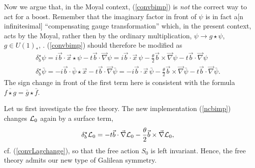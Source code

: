 \documentclass[a4paper,11pt]{article}
\def\vb{{\vec b}}
\def\vx{{\vec x}}
\def\vnabla{{\vec\nabla}}
\begin{document}
Now we argue that, in the Moyal context,
(\ref{convbimp}) is {\it not} the correct way to act for a boost.
Remember that the imaginary factor in front of $\psi$ is
in fact a[n infinitesimal] ``compensating gauge transformation''
which, in the present context, acts by the Moyal, rather then
by the ordinary multiplication,
$\psi\to g\star\psi$, $g\in U(1)_{*}$, \cite{Szabo}.
(\ref{convbimp}) should therefore be modified as
\begin{equation}
     \begin{array}{ll}
     \delta^{\star}_{b}\psi=i\vb\cdot\vx\star\psi-t\vb\cdot\vnabla\psi
     =i\vb\cdot\vx\,\psi
     -\frac{\theta}{2}\vb\times\vnabla\psi-t\vb\cdot\vnabla\psi
     \\[10pt]
     \delta^{\star}_{b}\bar{\psi}=
     -i\vb\cdot\bar{\psi}\star\vx-t\vb\cdot\vnabla\bar{\psi}
     =-i\vb\cdot\vx\,\bar{\psi}
     -\frac{\theta}{2}\vb\times\vnabla\bar{\psi}
     -t\vb\cdot\vnabla\bar{\psi}.
     \end{array}
     \label{ncbimp}
\end{equation}
The sign change in front of the first term here is consistent
with the formula $\overline{f\star g}=\bar{g}\star\bar{f}$.

Let us first investigate the free theory.
The new implementation (\ref{ncbimp})
changes ${\cal L}_{0}$ again by a surface term,
\begin{equation}
     \delta^{\star}_{b}{\cal L}_{0}=-t\vb\cdot\vnabla{\cal L}_{0}-
\frac{\theta}{2}\vb\times\vnabla{\cal L}_{0},
\label{newfreeactchange}
\end{equation}
cf. (\ref{convLagchange}), so that the free action $S_{0}$ is left invariant.
Hence, the free theory admits our new type
of Galilean symmetry.
\end{document}
